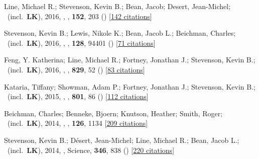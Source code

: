 \item[{\color{numcolor}\scriptsize10}] Line, Michael R.; Stevenson, Kevin B.; Bean, Jacob; Desert, Jean-Michel; \etal\ (incl.\ \textbf{LK}), 2016, , \aj, \textbf{152}, 203 () [\href{https://ui.adsabs.harvard.edu/abs/2016AJ....152..203L}{142 citations}]

\item[{\color{numcolor}\scriptsize9}] Stevenson, Kevin B.; Lewis, Nikole K.; Bean, Jacob L.; Beichman, Charles; \etal\ (incl.\ \textbf{LK}), 2016, , \pasp, \textbf{128}, 94401 () [\href{https://ui.adsabs.harvard.edu/abs/2016PASP..128i4401S}{71 citations}]

\item[{\color{numcolor}\scriptsize8}] Feng, Y. Katherina; Line, Michael R.; Fortney, Jonathan J.; Stevenson, Kevin B.; \etal\ (incl.\ \textbf{LK}), 2016, , \apj, \textbf{829}, 52 () [\href{https://ui.adsabs.harvard.edu/abs/2016ApJ...829...52F}{83 citations}]

\item[{\color{numcolor}\scriptsize7}] Kataria, Tiffany; Showman, Adam P.; Fortney, Jonathan J.; Stevenson, Kevin B.; \etal\ (incl.\ \textbf{LK}), 2015, , \apj, \textbf{801}, 86 () [\href{https://ui.adsabs.harvard.edu/abs/2015ApJ...801...86K}{112 citations}]

\item[{\color{numcolor}\scriptsize6}] Beichman, Charles; Benneke, Bjoern; Knutson, Heather; Smith, Roger; \etal\ (incl.\ \textbf{LK}), 2014, , \pasp, \textbf{126}, 1134 [\href{https://ui.adsabs.harvard.edu/abs/2014PASP..126.1134B}{209 citations}]

\item[{\color{numcolor}\scriptsize5}] Stevenson, Kevin B.; D{\'e}sert, Jean-Michel; Line, Michael R.; Bean, Jacob L.; \etal\ (incl.\ \textbf{LK}), 2014, , Science, \textbf{346}, 838 () [\href{https://ui.adsabs.harvard.edu/abs/2014Sci...346..838S}{220 citations}]

